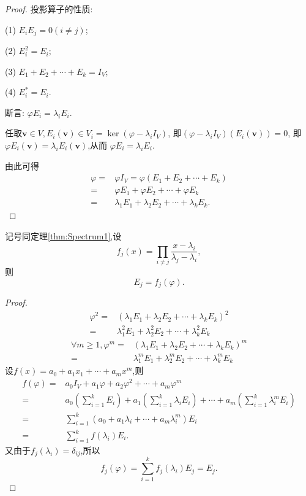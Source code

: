 \begin{proof}
  投影算子的性质:

  (1) $E_iE_j=0(i\neq j)$;

  (2) $E_i^2=E_i$;

  (3) $E_1+E_2+\cdots+E_k=I_V$;

  (4) $E_i^*=E_i$.

  断言: $\varphi E_i=\lambda_iE_i$.

  任取$\bm{v}\in V, E_i(\bm{v})\in V_i=\ker(\varphi-\lambda_iI_V)$,
  即$(\varphi-\lambda_iI_V)(E_i(\bm{v}))=0$,
  即$\varphi E_i(\bm{v})=\lambda_iE_i(\bm{v})$,从而
  $\varphi E_i=\lambda_iE_i$.

  由此可得
  \begin{align*}
    \varphi= & \varphi I_V=\varphi(E_1+E_2+\cdots+E_k)\\
    = & \varphi E_1+\varphi E_2+\cdots+\varphi E_k\\
    = & \lambda_1E_1+\lambda_2E_2+\cdots+\lambda_kE_k.
  \end{align*}
\end{proof}

\begin{theory}\label{thr:Spectrum1}
  记号同定理\ref{thm:Spectrum1},设
  \[
    f_j(x)=\prod_{i\neq j}\frac{x-\lambda_i}{\lambda_j-\lambda_i},
  \]
  则
  \[
    E_j=f_j(\varphi).
    \]
  \end{theory}

  \begin{proof}
    \begin{align*}
      \varphi^2= & (\lambda_1E_1+\lambda_2E_2+\cdots+\lambda_kE_k)^2\\
      = & \lambda_1^2E_1+\lambda_2^2E_2+\cdots+\lambda_k^2E_k
    \end{align*}
    \begin{align*}
      \forall m\geq 1, \varphi^m= & (\lambda_1E_1+\lambda_2E_2+\cdots+\lambda_kE_k)^m\\
      = & \lambda_1^mE_1+\lambda_2^mE_2+\cdots+\lambda_k^mE_k
    \end{align*}
    设$f(x)=a_0+a_1x_1+\cdots+a_mx^m$,则
    \begin{align*}
      f(\varphi)= & a_0I_V+a_1\varphi+a_2\varphi^2+\cdots+a_m\varphi^m\\
      = & a_0(\sum_{i=1}^kE_i)+a_1(\sum_{i=1}^k\lambda_iE_i)+\cdots+a_m(\sum_{i=1}^k\lambda_i^mE_i)\\
      = & \sum_{i=1}^k(a_0+a_1\lambda_i+\cdots+a_m\lambda_i^m)E_i\\
      = & \sum_{i=1}^k f(\lambda_i)E_i.
    \end{align*}
    又由于$f_j(\lambda_i)=\delta_{ij}$,所以
    \[
      f_j(\varphi)=\sum_{i=1}^k f_j(\lambda_i)E_j=E_j.
    \]
    
  \end{proof}

